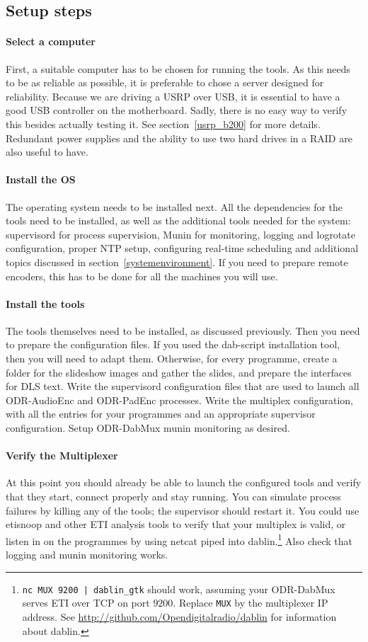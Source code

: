 \subsection{Setup steps}
\paragraph{Select a computer}
First, a suitable computer has to be chosen for running the tools. As this needs
to be as reliable as possible, it is preferable to chose a server designed for
reliability. Because we are driving a USRP over USB, it is essential to have a
good USB controller on the motherboard. Sadly, there is no easy way to verify
this besides actually testing it. See section~\ref{usrp_b200} for more details.
Redundant power supplies and the ability to use two hard drives in a RAID are
also useful to have.

\paragraph{Install the OS}
The operating system needs to be installed next. All the dependencies for the
tools need to be installed, as well as the additional tools needed for the
system: supervisord for process supervision, Munin for monitoring, logging and
logrotate configuration, proper NTP setup, configuring real-time scheduling and
additional topics discussed in section~\ref{systemenvironment}.
If you need to prepare remote encoders, this has to be done for all the machines
you will use.

\paragraph{Install the tools}
The tools themselves need to be installed, as discussed previously. Then you need
to prepare the configuration files. If you used the dab-script installation
tool, then you will need to adapt them. Otherwise, for every programme, create a
folder for the slideshow images and gather the slides, and prepare the interfaces
for DLS text. Write the supervisord configuration files that are used to launch all
ODR-AudioEnc and ODR-PadEnc processes. Write the multiplex configuration, with
all the entries for your programmes and an appropriate supervisor configuration.
Setup ODR-DabMux munin monitoring as desired.

\paragraph{Verify the Multiplexer}
At this point you should already be able to launch the configured tools and
verify that they start, connect properly and stay running.
You can simulate process failures by killing any of the tools; the supervisor
should restart it.
You could use etisnoop and other ETI analysis tools to verify that your
multiplex is valid, or listen in on the programmes by using netcat piped into
dablin.\footnote{\texttt{nc MUX 9200 | dablin\_gtk} should work, assuming
your ODR-DabMux serves ETI over TCP on port $9200$. Replace \texttt{MUX} by the
multiplexer IP address.
See \url{http://github.com/Opendigitalradio/dablin} for information about
dablin.}
Also check that logging and munin monitoring works.

